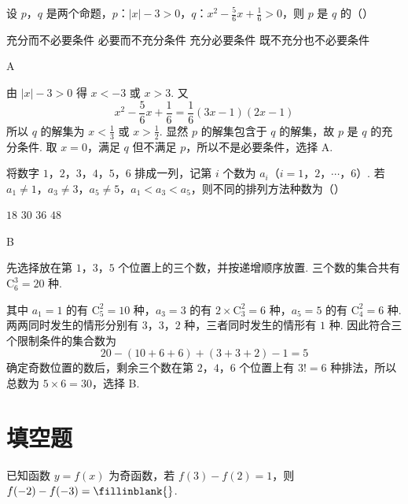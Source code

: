 \begin{problem}
设 \(p\)，\(q\) 是两个命题，\(p\)：\(|x|-3>0\)，\(q\)：\(x^2-\frac{5}{6}x+\frac{1}{6}>0\)，则 \(p\) 是 \(q\) 的（\quad）

\choices
    {充分而不必要条件}
    {必要而不充分条件}
    {充分必要条件}
    {既不充分也不必要条件}
\end{problem}

\begin{answer}
A
\end{answer}

\begin{solution}
由 \(|x|-3>0\) 得 \(x<-3\) 或 \(x>3\). 又
\[
x^2-\frac{5}{6}x+\frac{1}{6}=\frac{1}{6}(3x-1)(2x-1)
\]
所以 \(q\) 的解集为 \(x<\frac{1}{3}\) 或 \(x>\frac{1}{2}\). 显然 \(p\) 的解集包含于 \(q\) 的解集，故 \(p\) 是 \(q\) 的充分条件. 取 \(x=0\)，满足 \(q\) 但不满足 \(p\)，所以不是必要条件，选择 A.
\end{solution}

\begin{problem}
将数字 \(1\)，\(2\)，\(3\)，\(4\)，\(5\)，\(6\) 排成一列，记第 \(i\) 个数为 \(a_i\)（\(i=1\)，\(2\)，\(\cdots\)，\(6\)）. 若 \(a_1\neq1\)，\(a_3\neq3\)，\(a_5\neq5\)，\(a_1<a_3<a_5\)，则不同的排列方法种数为（\quad）

\choices
    {\(18\)}
    {\(30\)}
    {\(36\)}
    {\(48\)}
\end{problem}

\begin{answer}
B
\end{answer}

\begin{solution}
先选择放在第 \(1\)，\(3\)，\(5\) 个位置上的三个数，并按递增顺序放置. 三个数的集合共有 \(\mathrm C_6^3=20\) 种.

其中 \(a_1=1\) 的有 \(\mathrm C_5^2=10\) 种，\(a_3=3\) 的有 \(2\times\mathrm C_3^2=6\) 种，\(a_5=5\) 的有 \(\mathrm C_4^2=6\) 种. 两两同时发生的情形分别有 \(3\)，\(3\)，\(2\) 种，三者同时发生的情形有 \(1\) 种. 因此符合三个限制条件的集合数为
\[
20-(10+6+6)+(3+3+2)-1=5
\]
确定奇数位置的数后，剩余三个数在第 \(2\)，\(4\)，\(6\) 个位置上有 \(3!=6\) 种排法，所以总数为 \(5\times6=30\)，选择 B.
\end{solution}

\section{填空题}

\begin{problem}
已知函数 \(y=f(x)\) 为奇函数，若 \(f(3)-f(2)=1\)，则 \(f(-2)-f(-3)=\fillinblank{}\).
\end{problem}

